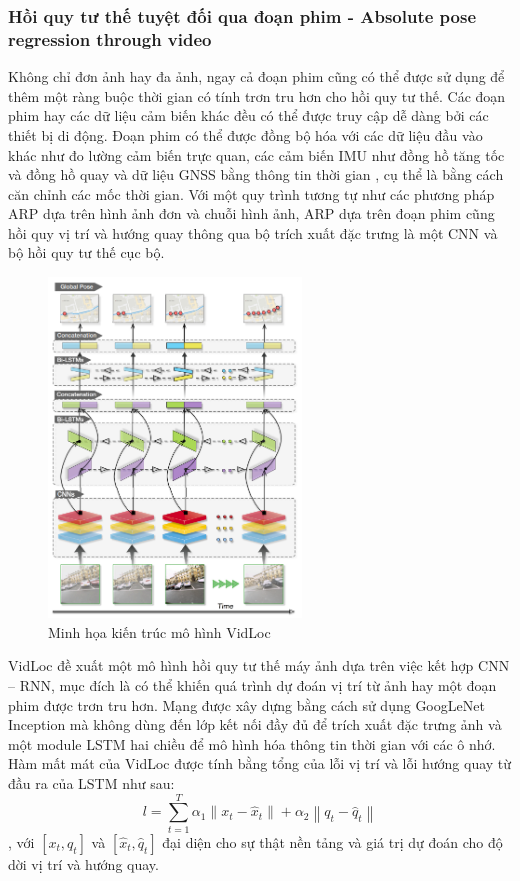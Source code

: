 \subsubsection*{Hồi quy tư thế tuyệt đối qua đoạn phim - Absolute pose regression through video}

Không chỉ đơn ảnh hay đa ảnh, ngay cả đoạn phim cũng có thể được sử dụng để thêm một ràng buộc thời gian có tính trơn tru hơn cho hồi quy tư thế. Các đoạn phim hay các dữ liệu cảm biến khác đều có thể được truy cập dễ dàng bởi các thiết bị di động. Đoạn phim có thể được đồng bộ hóa với các dữ liệu đầu vào khác như đo lường cảm biến trực quan, các cảm biến IMU như đồng hồ tăng tốc và đồng hồ quay và dữ liệu GNSS bằng thông tin thời gian , cụ thể là bằng cách căn chỉnh các mốc thời gian. Với một quy trình tương tự như các phương pháp ARP dựa trên hình ảnh đơn và chuỗi hình ảnh, ARP dựa trên đoạn phim cũng hồi quy vị trí và hướng quay thông qua bộ trích xuất đặc trưng là một CNN và bộ hồi quy tư thế cục bộ.
\begin{figure}[t]
    \centering
    \includegraphics[width=0.6\textwidth]{pics/Chapter2/vidloc.png}
    \caption{Minh họa kiến trúc mô hình VidLoc \cite{clark2017vidloc}}
\end{figure}
VidLoc \cite{clark2017vidloc} đề xuất một mô hình hồi quy tư thế máy ảnh dựa trên việc kết hợp CNN – RNN, mục đích là có thể khiến quá trình dự đoán vị trí từ ảnh hay một đoạn phim được trơn tru hơn. Mạng được xây dựng bằng cách sử dụng GoogLeNet Inception \cite{szegedy2014going} mà không dùng đến lớp kết nối đầy đủ để trích xuất đặc trưng ảnh và một module LSTM hai chiều để mô hình hóa thông tin thời gian với các ô nhớ.  Hàm mất mát của VidLoc được tính bằng tổng của lỗi vị trí và lỗi hướng quay từ đầu ra của LSTM như sau:
\begin{equation}
    l = \sum_{t=1}^T \alpha_1 \left \| x_t - \hat{x}_t \right \| + \alpha_2 \left \| q_t - \hat{q}_t \right \|
\end{equation},
với $[x_t, q_t]$ và $[\hat{x}_t, \hat{q}_t]$ đại diện cho sự thật nền tảng và giá trị dự đoán cho độ dời vị trí và hướng quay.

